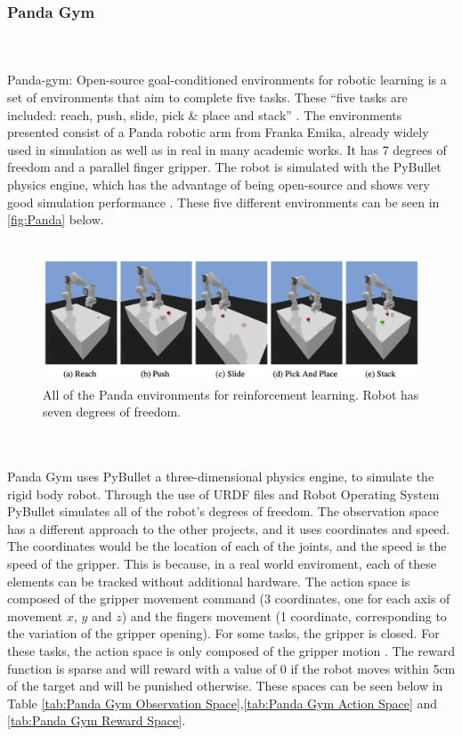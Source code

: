 \documentclass[a4paper,12pt]{article}
\begin{document}
\subsubsection{Panda Gym}
\\\\
Panda-gym: Open-source goal-conditioned environments for robotic learning is a set of environments that aim to complete five tasks. These ``five tasks are included: reach, push, slide, pick & place and stack'' \cite{PandaGym}. The environments presented consist of a Panda robotic arm from Franka Emika, already widely used in simulation as well as in real in many academic works. It has 7 degrees of freedom and a parallel finger gripper. The robot is simulated with the PyBullet physics engine, which has the advantage of being open-source and shows very good simulation performance \cite{PandaGym}. These five different environments can be seen in \autoref{fig:Panda} below. 
\\\\
\begin{figure}[H]
\label{fig:Panda}
\centering
\includegraphics[width=15cm]{imgs/Panda.png}
\caption{All of the Panda environments for reinforcement learning. Robot has seven degrees of freedom.}
\label{fig:Panda}
\end{figure}\\\\
Panda Gym uses PyBullet a three-dimensional physics engine, to simulate the rigid body robot. Through the use of URDF files and Robot Operating System PyBullet simulates all of the robot's degrees of freedom. The observation space has a different approach to the other projects, and it uses coordinates and speed. The coordinates would be the location of each of the joints, and the speed is the speed of the gripper. This is because, in a real world enviroment, each of these elements can be tracked without additional hardware. The action space is composed of the gripper movement command (3 coordinates, one for each axis of movement $x$, $y$ and $z$) and the fingers movement (1 coordinate, corresponding to the variation of the gripper opening). For some tasks, the gripper is closed. For these tasks, the action space is only composed of the gripper motion \cite{PandaGym}. The reward function is sparse and will reward with a value of 0 if the robot moves within 5cm of the target and will be punished otherwise. These spaces can be seen below in Table \ref{tab:Panda Gym Observation Space},\ref{tab:Panda Gym Action Space} and \ref{tab:Panda Gym Reward Space}.
\end{document}
